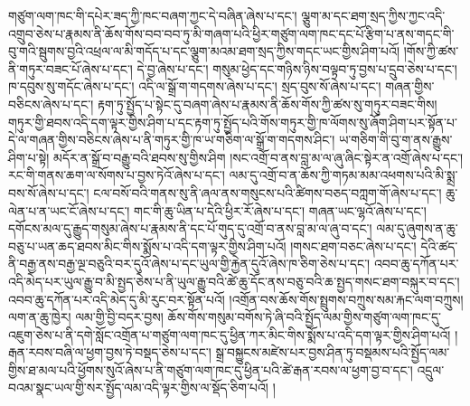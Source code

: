 གཙུག་ལག་ཁང་གི་དཔེར་ཟད་ཀྱི་ཁང་བཞག་ཀྱང་དེ་བཞིན་ཞེས་པ་དང་། ལྕུག་མ་དང་ཐག་སྲད་ཀྱིས་ཀྱང་འདི་འགྲུབ་ཅེས་པ་རྣམས་ནི་ཆོས་གོས་བབ་བབ་ཏུ་མི་གཞག་པའི་ཕྱིར་གཙུག་ལག་ཁང་དང་པོ་རྩིག་པ་ནས་གདང་གི་བུ་གའི་སྦུགས་བྱའི་འཕྲལ་ལ་མི་གདོད་པ་དང་ལྕུག་མའམ་ཐག་སྲད་ཀྱིས་གདང་ཡང་གྱིས་ཤིག་པའོ། །གོས་ཀྱི་ཚས་ནི་གཏུར་བཟང་པོ་ཞེས་པ་དང་། དེ་བྱ་ཞེས་པ་དང་། གསུམ་ཕྱེད་དང་གཉིས་ཉིས་བལྟབ་ཏུ་བྱས་པ་དྲུབ་ཅེས་པ་དང་། ཁ་དབུས་སུ་གདོང་ཞེས་པ་དང་། འདི་ལ་སྒྲོ་ག་གདགས་ཞེས་པ་དང་། སྲད་བུས་སོ་ཞེས་པ་དང་། གཞན་གྱིས་བཅིངས་ཞེས་པ་དང་། རྟག་ཏུ་སྤྱོད་པ་སྟེང་དུ་བཞག་ཞེས་པ་རྣམས་ནི་ཆོས་གོས་ཀྱི་ཚས་སུ་གཏུར་བཟང་གིས། གཏུར་གྱི་ཐབས་འདི་དག་ལྟར་གྱིས་ཤིག་པ་དང་རྟག་ཏུ་སྤྱོད་པའི་གོས་གཏུར་གྱི་ཁ་ལོགས་སུ་ཞོག་ཤིག་པར་སྟོན་པ་དེ་ལ་གཞན་གྱིས་བཅིངས་ཞེས་པ་ནི་གཏུར་གྱི་ཁ་ཡ་གཅིག་ལ་སྒྲོ་ག་གདགས་ཤིང་། ཡ་གཅིག་གི་བུ་ག་ནས་རྒྱུས་ཤིག་པ་སྟེ། མདོར་ན་སྒྲོ་བ་བརྒྱུ་བའི་ཐབས་སུ་གྱིས་ཤིག །སང་འགྲོ་བ་ནས་བླ་མ་ལ་ཞུ་ཞིང་སྟེར་ན་འགྲོ་ཞེས་པ་དང་། རང་གི་གནས་ཆག་ལ་སོགས་པ་བྱས་ཏེའོ་ཞེས་པ་དང་། ལམ་དུ་འགྲོ་བ་ན་ཆོས་ཀྱི་གཏམ་མམ་འཕགས་པའི་མི་སྨྲ་བས་སོ་ཞེས་པ་དང་། ངལ་བསོ་བའི་གནས་སུ་ནི་ཞལ་ནས་གསུངས་པའི་ཚིགས་བཅད་བཀླག་གོ་ཞེས་པ་དང་། ཆུ་ལེན་པ་ན་ཡང་ངོ་ཞེས་པ་དང་། གང་གི་ཆུ་ཡིན་པ་དེའི་ཕྱིར་རོ་ཞེས་པ་དང་། གཞན་ཡང་ལྷའོ་ཞེས་པ་དང་། དགོངས་མལ་དུ་རྒྱུད་གསུམ་ཞེས་པ་རྣམས་ནི་དང་པོ་གུད་དུ་འགྲོ་བ་ནས་བླ་མ་ལ་ཞུ་བ་དང་། ལམ་དུ་ཞུགས་ན་ཆུ་བཅུ་པ་ཡན་ཆད་ཐབས་མིང་གིས་སྨོས་པ་འདི་དག་ལྟར་གྱིས་ཤིག་པའོ། །གསང་ཐག་བཅང་ཞེས་པ་དང་། དེའི་ཚད་ནི་བརྒྱ་ནས་བརྒྱ་ལྔ་བཅུའི་བར་དུའོ་ཞེས་པ་དང་ཡུལ་གྱི་རྐྱེན་དུའོ་ཞེས་ཁ་ཅིག་ཅེས་པ་དང་། འབབ་ཆུ་དཀོན་པར་འདི་མེད་པར་ཡུལ་རྒྱུ་བ་མི་སྤྱད་ཅེས་པ་ནི་ཡུལ་རྒྱུ་བའི་ཚེ་ཆུ་དོང་ནས་བཅུ་བའི་ཆ་སྤྱད་གསང་ཐག་བསྐུར་བ་དང་། འབབ་ཆུ་དཀོན་པར་འདི་མེད་དུ་མི་རུང་བར་སྟོན་པའོ། །འགྲོན་བས་ཆོས་གོས་སྤྲུགས་བཀྲུས་སམ་རྐང་ལག་བཀྲུས། ལག་ན་ཆུ་ཁྱེར། ལམ་གྱི་བྱི་བདར་བྱས། ཆོས་གོས་གསུམ་བགོས་ཏེ་ཞི་བའི་སྤྱོད་ལམ་གྱིས་གཙུག་ལག་ཁང་དུ་འཇུག་ཅེས་པ་ནི་དགེ་སློང་འགྲོན་པ་གཙུག་ལག་ཁང་དུ་ཕྱིན་ཀར་མིང་གིས་སྨོས་པ་འདི་དག་ལྟར་གྱིས་ཤིག་པའོ། །རྒན་རབས་བཞི་ལ་ཕྱག་བྱས་ཏེ་བསྡད་ཅེས་པ་དང་། སྒྲ་བསྐྱུངས་མཛེས་པར་བྱས་ཤིན་ཏུ་བསྡམས་པའི་སྤྱོད་ལམ་གྱིས་ཐ་མལ་པའི་ཕྱོགས་སུའོ་ཞེས་པ་ནི་གཙུག་ལག་ཁང་དུ་ཕྱིན་པའི་ཚེ་རྒན་རབས་ལ་ཕྱག་བྱ་བ་དང་། འདྲུལ་བའམ་སྣང་ཡལ་གྱི་སར་སྤྱོད་ལམ་འདི་ལྟར་གྱིས་ལ་སྡོད་ཅིག་པའོ། །
